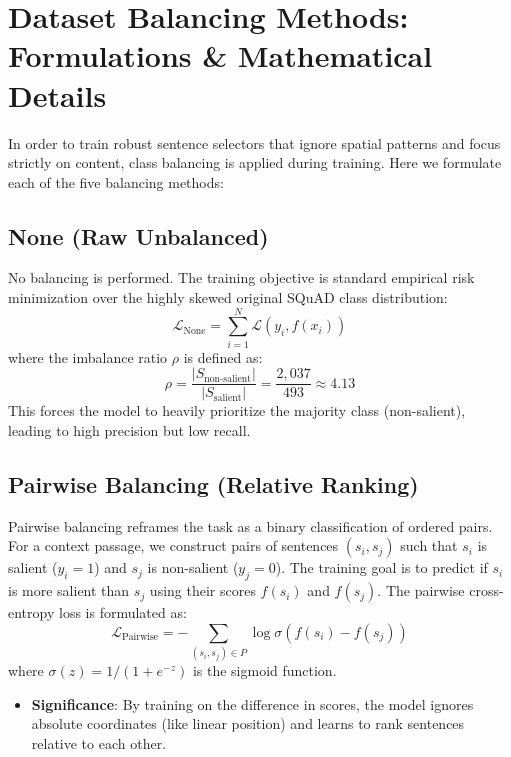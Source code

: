 \documentclass[11pt,a4paper]{article}
\begin{document}
\section{Dataset Balancing Methods: Formulations \& Mathematical Details}

In order to train robust sentence selectors that ignore spatial patterns and focus strictly on content, class balancing is applied during training. Here we formulate each of the five balancing methods:

\subsection{None (Raw Unbalanced)}
No balancing is performed. The training objective is standard empirical risk minimization over the highly skewed original SQuAD class distribution:
\[
\mathcal{L}_{\text{None}} = \sum_{i=1}^N \mathcal{L}(y_i, f(x_i))
\]
where the imbalance ratio $\rho$ is defined as:
\[
\rho = \frac{|S_{\text{non-salient}}|}{|S_{\text{salient}}|} = \frac{2,037}{493} \approx 4.13
\]
This forces the model to heavily prioritize the majority class (non-salient), leading to high precision but low recall.

\subsection{Pairwise Balancing (Relative Ranking)}
Pairwise balancing reframes the task as a binary classification of ordered pairs. For a context passage, we construct pairs of sentences $(s_i, s_j)$ such that $s_i$ is salient ($y_i = 1$) and $s_j$ is non-salient ($y_j = 0$). 
The training goal is to predict if $s_i$ is more salient than $s_j$ using their scores $f(s_i)$ and $f(s_j)$.
The pairwise cross-entropy loss is formulated as:
\[
\mathcal{L}_{\text{Pairwise}} = -\sum_{(s_i, s_j) \in P} \log \sigma \left( f(s_i) - f(s_j) \right)
\]
where $\sigma(z) = 1 / (1 + e^{-z})$ is the sigmoid function. 
\begin{itemize}
    \item \textbf{Significance}: By training on the difference in scores, the model ignores absolute coordinates (like linear position) and learns to rank sentences relative to each other.
\end{itemize}
\end{document}
